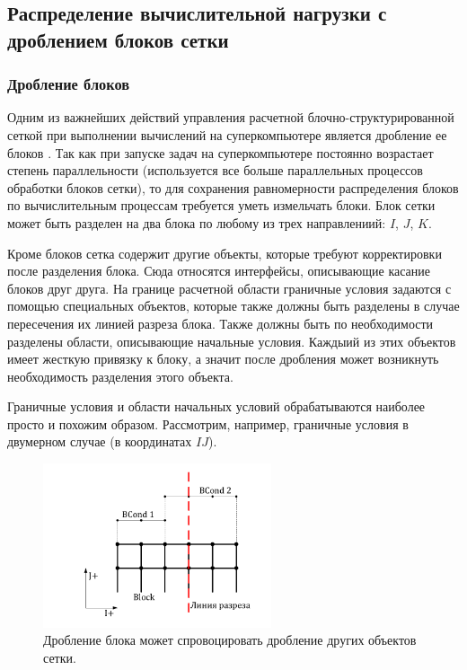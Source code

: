 \subsection{Распределение вычислительной нагрузки с дроблением блоков сетки}

\subsubsection{Дробление блоков}

Одним из важнейших действий управления расчетной блочно-структурированной сеткой при выполнении вычислений на суперкомпьютере является дробление ее блоков \cite{Rybakov2016WithCut}.
Так как при запуске задач на суперкомпьютере постоянно возрастает степень параллельности (используется все больше параллельных процессов обработки блоков сетки), то для сохранения равномерности распределения блоков по вычислительным процессам требуется уметь измельчать блоки.
Блок сетки может быть разделен на два блока по любому из трех направлениий: $I$, $J$, $K$.

Кроме блоков сетка содержит другие объекты, которые требуют корректировки после разделения блока.
Сюда относятся интерфейсы, описывающие касание блоков друг друга.
На границе расчетной области граничные условия задаются с помощью специальных объектов, которые также должны быть разделены в случае пересечения их линией разреза блока.
Также должны быть по необходимости разделены области, описывающие начальные условия.
Каждыий из этих объектов имеет жесткую привязку к блоку, а значит после дробления может возникнуть
необходимость разделения этого объекта.

Граничные условия и области начальных условий обрабатываются наиболее просто и похожим образом.
Рассмотрим, например, граничные условия в двумерном случае (в координатах $IJ$).

\begin{figure}[ht]
	\centering
	\includegraphics[width=0.6\textwidth]{./pics/text_2_withcut/cut-bcond.pdf}
	\caption{Дробление блока может спровоцировать дробление других объектов сетки.}
	\label{fig:text_2_withcut_cut_bcond}
\end{figure}

